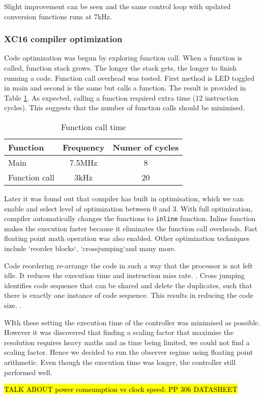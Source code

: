 Slight improvement can be seen and the same control loop with updated conversion functions runs at 7kHz.

\subsubsection{XC16 compiler optimization}
Code optimization was begun by exploring function call. When a function is called, function stack grows. The longer the stack gets, the longer to finish running a code. Function call overhead was tested. First method is LED toggled in main and second is the same but calls a function. The result is provided in Table \ref{tab:stack}. As expected, calling a function required extra time (12 instruction cycles). This suggests that the number of function calls should be minimised. 

\begin{table}[h]
\centering
\begin{tabular}{|p{4cm} | c | c|}
\hline
Function        & Frequency & Numer of cycles\\ \hline \hline
Main            & 7.5MHz    & 8\\ \hline
Function call   & 3kHz      & 20\\ \hline
\end{tabular}
\caption{Function call time}
\label{tab:stack}
\end{table}

Later it was found out that compiler has built in optimisation, which we can enable and select level of optimization between 0 and 3. With full optimization, compiler automatically changes the functions to \texttt{inline} function. Inline function makes the execution faster because it eliminates the function call overheads. Fast floating point math operation was also enabled. Other optimization techniques include \lq reorder blocks\lq, \lq crossjumping\lq and many more. 

Code reordering re-arrange the code in such a way that the processor is not left idle. It reduces the execution time and instruction miss rate. \cite{reordering}.  
Cross jumping identifies code sequence that can be shared and delete the duplicates, such that there is exactly one instance of code sequence. This results in reducing the code size. \cite{cross}.

WIth these setting the execution time of the controller was minimised as possible. However it was discovered that finding a scaling factor that maximise the resolution requires heavy maths and as time being limited, we could not find a scaling factor. Hence we decided to run the observer regime using floating point arithmetic. Even though the execution time was longer, the controller still performed well. 


\hl{TALK ABOUT power comsumption vs clock speed: PP 306 DATASHEET}